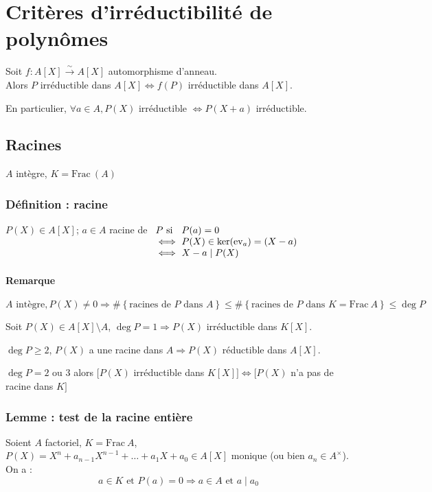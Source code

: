 \documentclass[reqno,a4paper,10pt]{report}
\makeatletter
\newcommand{\set}[1]{\left\lbrace #1 \right\rbrace} %
\newcommand{\Frac}{\mathrm{Frac}\:} %
\newcommand{\so}{\Rightarrow}
\newcommand{\soo}{\Longrightarrow}
\newcommand{\bij}{\overset{\!\sim}{\to}} %
\newcommand{\ev}[1]{\mathrm{ev}_{ #1 }}
\newcommand{\et}{\text{ et }}
\newcommand{\ou}{\text{ ou }}
\let\olditemize=\itemize%
\renewenvironment{itemize}{%
    \olditemize%
  }{%
    \@noparlisttrue%
    \endlist%
  }%
\makeatother
\begin{document}
\section{Critères d'irréductibilité de polynômes}
Soit $f:A[X] \bij A[X]$ automorphisme d'anneau.\\
Alors $P$ irréductible dans $A[X] \iff f(P)$ irréductible dans $A[X]$.

En particulier, $\forall a \in A, P(X)$ irréductible $\iff P(X+a)$
irréductible.

\subsection{Racines}
$A$ intègre, $K=\Frac(A)$

\subsubsection{Définition : racine}
$P(X)\in A[X]$; $a\in A$ racine de
$
\begin{array}[t]{l@{\ }l}
  P \text{ si } &P(a)=0\\
  \iff &P(X)\in \ker(\ev a)=(X-a) \\
\iff &X-a \mid P(X)
\end{array}
$

\paragraph{Remarque}
\begin{itemize}
  \item $A \text{ intègre}, P(X)\neq 0 \so \# \set{\text{racines de }P
    \text{ dans }A} \leq \#\set{\text{racines de }P\text{ dans }K=\Frac
    A}\leq \deg P$
  \item Soit $P(X) \in A[X]\setminus A$, $\deg P=1 \so P(X)$ irréductible dans
    $K[X]$.
  \item $\deg P \geq 2$, $P(X)$ a une racine dans $A\so P(X)$ réductible dans
    $A[X]$. 
  \item $\deg P =2 \ou 3$ alors $[P(X)$ irréductible dans $K[X]] \iff [P(X)$
    n'a pas de racine dans $K]$
\end{itemize}

\subsubsection{Lemme : test de la racine entière}
Soient $A$ factoriel, $K=\Frac A$, $P(X)=X^n+a_{n-1} X^{n-1}+ \dots + a_1 X +
a_0 \in A[X]$ monique (ou bien $a_n \in A^\times$). On a :
\[a\in K \et P(a)=0 \soo a\in A \et a \mid a_0\]
\end{document}
